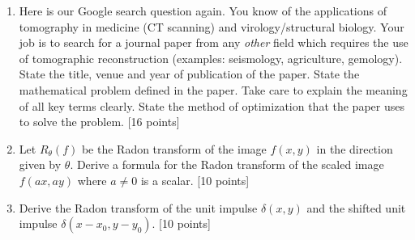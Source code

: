 \documentclass[11pt]{article}
\begin{document}
\begin{enumerate}
\item Here is our Google search question again. You know of the applications of tomography in medicine (CT scanning) and virology/structural biology. Your job is to search for a journal paper from any \emph{other} field which requires the use of tomographic reconstruction (examples: seismology, agriculture, gemology). State the title, venue and year of publication of the paper. State the mathematical problem defined in the paper. Take care to explain the meaning of all key terms clearly. State the method of optimization that the paper uses to solve the problem. \textsf{[16 points]}

\item Let $R_{\theta}(f)$ be the Radon transform of the image $f(x,y)$ in the direction given by $\theta$. Derive a formula for the Radon transform of the scaled image $f(ax, ay)$ where $a \neq 0$ is a scalar. \textsf{[10 points]}

\item Derive the Radon transform of the unit impulse $\delta(x,y)$ and the shifted unit impulse $\delta(x-x_0,y-y_0)$. \textsf{[10 points]}

\end{enumerate}
\end{document}
